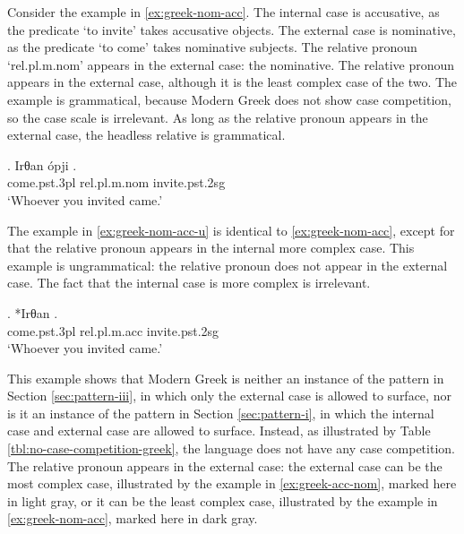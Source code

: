 Consider the example in \ref{ex:greek-nom-acc}.
The internal case is accusative, as the predicate  `to invite' takes accusative objects.
The external case is nominative, as the predicate  `to come' takes nominative subjects.
The relative pronoun  `\ac{rel}.\ac{pl}.\ac{m}.\ac{nom}' appears in the external case: the nominative.
The relative pronoun appears in the external case, although it is the least complex case of the two. The example is grammatical, because Modern Greek does not show case competition, so the case scale is irrelevant. As long as the relative pronoun appears in the external case, the headless relative is grammatical.

\exg. Irθan ópji .\\
come.\ac{pst}.3\ac{pl}\scsub{[nom]} \ac{rel}.\ac{pl}.\ac{m}.\ac{nom} invite.\ac{pst}.2\ac{sg}\scsub{[acc]}\\
`Whoever you invited came.'\label{ex:greek-nom-acc}

The example in \ref{ex:greek-nom-acc-u} is identical to \ref{ex:greek-nom-acc}, except for that the relative pronoun appears in the internal  more complex case. This example is ungrammatical: the relative pronoun does not appear in the external case. The fact that the internal case is more complex is irrelevant.

\exg. *Irθan  .\\
come.\ac{pst}.3\ac{pl}\scsub{[nom]} \ac{rel}.\ac{pl}.\ac{m}.\ac{acc} invite.\ac{pst}.2\ac{sg}\scsub{[acc]}\\
`Whoever you invited came.'\label{ex:greek-nom-acc-u}

This example shows that Modern Greek is neither an instance of the pattern in Section \ref{sec:pattern-iii}, in which only the external case is allowed to surface, nor is it an instance of the pattern in Section \ref{sec:pattern-i}, in which the internal case and external case are allowed to surface.
Instead, as illustrated by Table \ref{tbl:no-case-competition-greek}, the language does not have any case competition. The relative pronoun appears in the external case: the external case can be the most complex case, illustrated by the example in \ref{ex:greek-acc-nom}, marked here in light gray, or it can be the least complex case, illustrated by the example in \ref{ex:greek-nom-acc}, marked here in dark gray.

